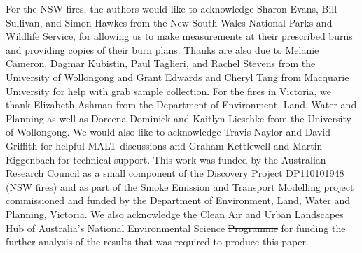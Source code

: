 \documentclass[acp, manuscript]{copernicus}
\providecommand{\DIFadd}[1]{{\protect\color{blue}\uwave{#1}}} %
\providecommand{\DIFdel}[1]{{\protect\color{red}\sout{#1}}}                      %
\providecommand{\DIFaddbegin}{} %
\providecommand{\DIFaddend}{} %
\providecommand{\DIFdelbegin}{} %
\providecommand{\DIFdelend}{} %
\begin{document}



\begin{acknowledgements}
For the NSW fires, the authors would like to acknowledge Sharon Evans, Bill Sullivan, and Simon Hawkes from the New South Wales National Parks and Wildlife Service, for allowing us to make measurements at their prescribed burns and providing copies of their burn plans. Thanks are also due to Melanie Cameron, Dagmar Kubistin, Paul Taglieri, and Rachel Stevens from the University of Wollongong and Grant Edwards and Cheryl Tang from Macquarie University for help with grab sample collection. For the fires in Victoria, we thank Elizabeth Ashman from the Department of Environment, Land, Water and Planning as well as Doreena Dominick and Kaitlyn Lieschke from the University of Wollongong. We would also like to acknowledge Travis Naylor and David Griffith for helpful MALT discussions and Graham Kettlewell and Martin Riggenbach for technical support. This work was funded by the Australian Research Council as a small component of the Discovery Project DP110101948 (NSW fires) and as part of the Smoke Emission and Transport Modelling project commissioned and funded by the Department of Environment, Land, Water and Planning, Victoria. We also acknowledge the Clean Air and Urban Landscapes Hub of Australia's National Environmental Science
\DIFdelbegin \DIFdel{Programme }\DIFdelend \DIFaddbegin \DIFadd{Program }\DIFaddend for funding the further analysis of the results that was
required to produce this paper.
\end{acknowledgements}
\end{document}
